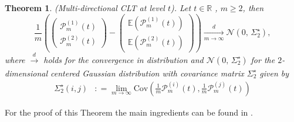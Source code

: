 \documentclass[12pt]{article}
\theoremstyle{Theorem}
\newtheorem{Theorem}{Theorem}[section]
\begin{document}
\begin{Theorem}(Multi-directional CLT at level $t$). Let $t \in \mathbb{R}$ , $m \geq 2$, then
\begin{equation*}
\frac{1}{m}\left(\begin{pmatrix} \mathcal{P}^{\scriptscriptstyle (1)}_{m}(t) \\ \mathcal{P}^{\scriptscriptstyle (2)}_{m}(t) \end{pmatrix} - \begin{pmatrix} \mathbb{E}\left(\mathcal{P}^{\scriptscriptstyle (1)}_{m}(t)\right)  \\\mathbb{E}(\mathcal{P}^{\scriptscriptstyle (2)}_{m}(t)) \end{pmatrix}\right) \xrightarrow[m \to \infty]{d} \mathcal{N}\left(0,\,\Sigma_{2}^{\star}\right),
\end{equation*}
where $\xrightarrow[]{d}$ holds for the convergence in distribution and $\mathcal{N}\left(0,\,\Sigma_{2}^{\star}\right)$ for the $2$-dimensional centered Gaussian distribution with covariance matrix $\Sigma_{2}^\star$ given by
\begin{align*}
\Sigma^{\star}_{2}(i,j) & : = \lim_{m \to \infty}\text{Cov}\left(\frac{1}{m}\mathcal{P}^{\scriptscriptstyle (i)}_{m}(t), \frac{1}{m}\mathcal{P}^{\scriptscriptstyle (j)}_{m}(t) \right)
\end{align*}
\end{Theorem}
For the proof of this Theorem the main ingredients can be found in \cite{RVY}.
\end{document}
